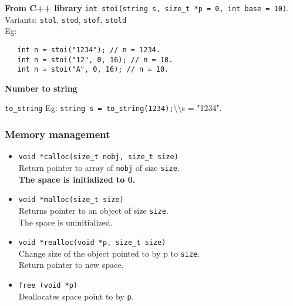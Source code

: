\textbf{From C++ library}
\texttt{int stoi(string s, size\_t *p = 0, int base = 10)}.\\
Variants: \texttt{stol}, \texttt{stod}, \texttt{stof}, \texttt{stold}\\
Eg:\\
\begin{verbatim}
   int n = stoi("1234"); // n = 1234.
   int n = stoi("12", 0, 16); // n = 18.
   int n = stoi("A", 0, 16); // n = 10.
\end{verbatim}

\begin{center}
    \textbf{Number to string}
\end{center}

\texttt{to\_string}
Eg: \texttt{string s = to\_string(1234);}\textbackslash\textbackslash s = "1234".\\


\subsubsection{Memory management}

\begin{itemize}
	
\item \texttt{void *calloc(size\_t nobj, size\_t size)}\\
Return pointer to array of \texttt{nobj} of size \texttt{size}.\\
\textbf{The space is initialized to 0.}

\item \texttt{void *malloc(size\_t size)}\\
Returns pointer to an object of size \texttt{size}.\\
The space is uninitialized.\\

\item \texttt{void *realloc(void *p, size\_t size)}\\
Change size of the object pointed to by p to \texttt{size}.\\
Return pointer to new space.\\

\item \texttt{free (void *p)}\\
Deallocates space point to by \texttt{p}.\\

\end{itemize}

